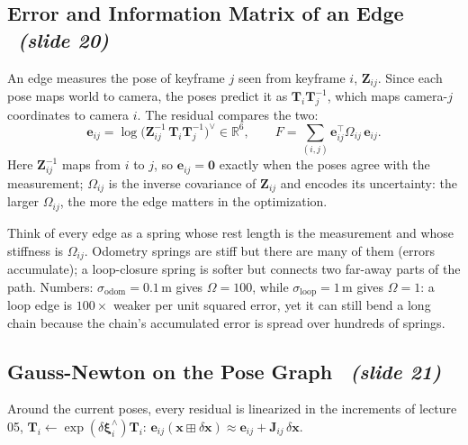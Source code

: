 \documentclass[11pt,a4paper]{article}
\newcommand{\slrs}[1]{\texorpdfstring{\ \emph{(slide #1)}}{ (slide #1)}}
\newcommand{\R}{\mathbb{R}}
\newcommand{\be}{\mathbf{e}}
\newcommand{\bJ}{\mathbf{J}}
\newcommand{\bT}{\mathbf{T}}
\begin{document}
\subsection{Error and Information Matrix of an Edge \slrs{20}}
An edge measures the pose of keyframe $j$ seen from keyframe $i$, $\mathbf Z_{ij}$. Since each pose maps world to camera, the poses predict it as $\bT_i\bT_j^{-1}$, which maps camera-$j$ coordinates to camera $i$. The residual compares the two:
\[
\be_{ij}=\log\!\big(\mathbf Z_{ij}^{-1}\,\bT_i\bT_j^{-1}\big)^\vee\in\R^6,\qquad F=\sum_{(i,j)}\be_{ij}^\top\Omega_{ij}\,\be_{ij}.
\]
Here $\mathbf Z_{ij}^{-1}$ maps from $i$ to $j$, so $\be_{ij}=\mathbf 0$ exactly when the poses agree with the measurement; $\Omega_{ij}$ is the inverse covariance of $\mathbf Z_{ij}$ and encodes its uncertainty: the larger $\Omega_{ij}$, the more the edge matters in the optimization.
\begin{intuition}
Think of every edge as a spring whose rest length is the measurement and whose stiffness is $\Omega_{ij}$. Odometry springs are stiff but there are many of them (errors accumulate); a loop-closure spring is softer but connects two far-away parts of the path. Numbers: $\sigma_{\text{odom}}=0.1$\,m gives $\Omega=100$, while $\sigma_{\text{loop}}=1$\,m gives $\Omega=1$: a loop edge is $100\times$ weaker per unit squared error, yet it can still bend a long chain because the chain's accumulated error is spread over hundreds of springs.
\end{intuition}

\subsection{Gauss-Newton on the Pose Graph \slrs{21}}
Around the current poses, every residual is linearized in the increments of lecture 05, $\bT_i\leftarrow\exp(\delta\boldsymbol\xi_i^\wedge)\bT_i$: $\be_{ij}(\mathbf x\boxplus\delta\mathbf x)\approx\be_{ij}+\bJ_{ij}\,\delta\mathbf x$.
\end{document}
